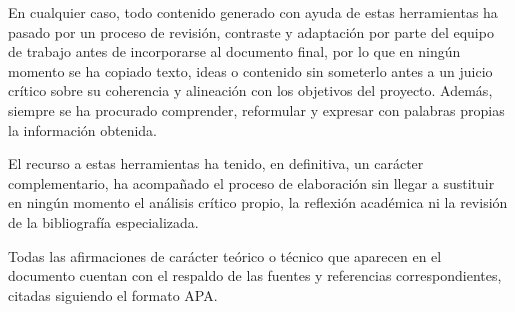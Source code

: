 \documentclass[11pt,a4paper,spanish,oneside]{book}
\numberwithin{equation}{chapter}
\numberwithin{figure}{chapter}
\begin{document}
En cualquier caso, todo contenido generado con ayuda de estas herramientas ha pasado por un proceso de revisión, contraste y adaptación por parte del equipo de trabajo antes de incorporarse al documento final, por lo que en ningún momento se ha copiado texto, ideas o contenido sin someterlo antes a un juicio crítico sobre su coherencia y alineación con los objetivos del proyecto. Además, siempre se ha procurado comprender, reformular y expresar con palabras propias la información obtenida.

El recurso a estas herramientas ha tenido, en definitiva, un carácter complementario, ha acompañado el proceso de elaboración sin llegar a sustituir en ningún momento el análisis crítico propio, la reflexión académica ni la revisión de la bibliografía especializada. 

Todas las afirmaciones de carácter teórico o técnico que aparecen en el documento cuentan con el respaldo de las fuentes y referencias correspondientes, citadas siguiendo el formato APA.
\end{document}
